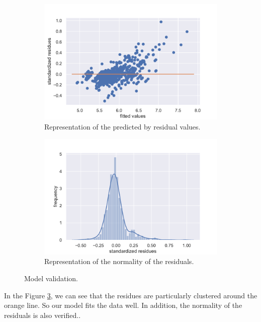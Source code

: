 \documentclass{article}
\begin{document}
\begin{figure}[H]
\centering
\begin{subfigure}{.5\textwidth}
  \centering
  \includegraphics[width=1\linewidth]{./images/homo_mod3.pdf}
  \caption{Representation of the predicted by residual values.}
  \label{fig:homo_mod3}
\end{subfigure}%
\begin{subfigure}{.5\textwidth}
  \centering
  \includegraphics[width=1\linewidth, clip,trim={0cm 0cm 0cm 0.6cm} ]{./images/resid_norm_m3.pdf}
  \caption{Representation of the normality of the residuals.}
  \label{fig:resid3}
\end{subfigure}
\caption{Model validation.}
\label{fig:valid_3}
\end{figure}

In the Figure \ref{fig:valid_3}, we can see that the residues are particularly clustered around the orange line. So our model fits the data well. In addition, the normality of the residuals is also verified..
\end{document}
